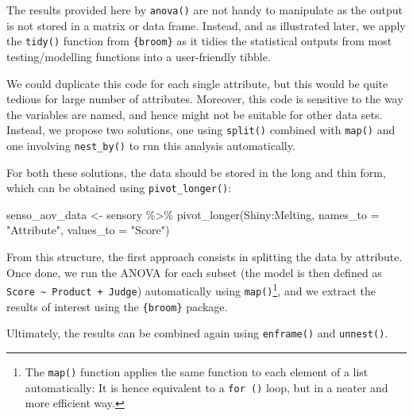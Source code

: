\documentclass[
]{krantz}
\makeatletter
\newenvironment{Shaded}{\begin{snugshade}}{\end{snugshade}}
\newcommand{\AttributeTok}[1]{\textcolor[rgb]{0.61,0.61,0.61}{#1}}
\newcommand{\FunctionTok}[1]{\textcolor[rgb]{0,0,0}{#1}}
\newcommand{\NormalTok}[1]{#1}
\newcommand{\OtherTok}[1]{\textcolor[rgb]{0.37,0.37,0.37}{#1}}
\newcommand{\SpecialCharTok}[1]{\textcolor[rgb]{0,0,0}{#1}}
\newcommand{\StringTok}[1]{\textcolor[rgb]{0.5,0.5,0.5}{#1}}
\renewenvironment{quote}{\begin{VF}}{\end{VF}}
\newenvironment{kframe}{%
\medskip{}
\setlength{\fboxsep}{.8em}
 \def\at@end@of@kframe{}%
 \ifinner\ifhmode%
  \def\at@end@of@kframe{\end{minipage}}%
  \begin{minipage}{\columnwidth}%
 \fi\fi%
 \def\FrameCommand##1{\hskip\@totalleftmargin \hskip-\fboxsep
 \colorbox{shadecolor}{##1}\hskip-\fboxsep
     \hskip-\linewidth \hskip-\@totalleftmargin \hskip\columnwidth}%
 \MakeFramed {\advance\hsize-\width
   \@totalleftmargin\z@ \linewidth\hsize
   \@setminipage}}%
 {\par\unskip\endMakeFramed%
 \at@end@of@kframe}
\renewenvironment{Shaded}{\begin{kframe}}{\end{kframe}}
\makeatother
\begin{document}
\begin{quote}
The results provided here by \texttt{anova()} are not handy to manipulate as the output is not stored in a matrix or data frame. Instead, and as illustrated later, we apply the \texttt{tidy()} function from \texttt{\{broom\}} as it tidies the statistical outputs from most testing/modelling functions into a user-friendly tibble.
\end{quote}

We could duplicate this code for each single attribute, but this would be quite tedious for large number of attributes. Moreover, this code is sensitive to the way the variables are named, and hence might not be suitable for other data sets. Instead, we propose two solutions, one using \texttt{split()} combined with \texttt{map()} and one involving \texttt{nest\_by()} to run this analysis automatically.

For both these solutions, the data should be stored in the long and thin form, which can be obtained using \texttt{pivot\_longer()}:

\begin{Shaded}
\begin{Highlighting}[]
\NormalTok{senso\_aov\_data }\OtherTok{\textless{}{-}}\NormalTok{ sensory }\SpecialCharTok{\%\textgreater{}\%}
  \FunctionTok{pivot\_longer}\NormalTok{(Shiny}\SpecialCharTok{:}\NormalTok{Melting, }\AttributeTok{names\_to =} \StringTok{"Attribute"}\NormalTok{, }\AttributeTok{values\_to =} \StringTok{"Score"}\NormalTok{)}
\end{Highlighting}
\end{Shaded}

From this structure, the first approach consists in splitting the data by attribute. Once done, we run the ANOVA for each subset (the model is then defined as \texttt{Score\ \textasciitilde{}\ Product\ +\ Judge}) automatically using \texttt{map()}\footnote{The \texttt{map()} function applies the same function to each element of a list automatically: It is hence equivalent to a \texttt{for\ ()} loop, but in a neater and more efficient way.}, and we extract the results of interest using the \texttt{\{broom\}} package.

Ultimately, the results can be combined again using \texttt{enframe()} and \texttt{unnest()}.
\end{document}
